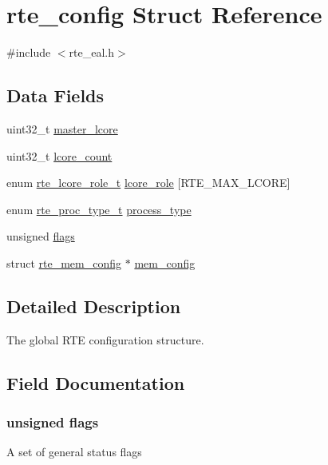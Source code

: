 \hypertarget{structrte__config}{}\section{rte\+\_\+config Struct Reference}
\label{structrte__config}


{\ttfamily \#include $<$rte\+\_\+eal.\+h$>$}

\subsection*{Data Fields}
\begin{DoxyCompactItemize}
\item 
uint32\+\_\+t \hyperlink{structrte__config_abe59d1b8baa4c39f023b18bd28bfd555}{master\+\_\+lcore}
\item 
uint32\+\_\+t \hyperlink{structrte__config_a17ac87c5aeee30c5651a0eb3cfa9e0df}{lcore\+\_\+count}
\item 
enum \hyperlink{rte__eal_8h_a4b3d3708f5bd9a9634d494b64cafc0b8}{rte\+\_\+lcore\+\_\+role\+\_\+t} \hyperlink{structrte__config_a79a713f1c76515dd44c9ba8b55d090b5}{lcore\+\_\+role} \mbox{[}R\+T\+E\+\_\+\+M\+A\+X\+\_\+\+L\+C\+O\+R\+E\mbox{]}
\item 
enum \hyperlink{rte__eal_8h_a1c1b5d8e30606d1b95f36413c2294d49}{rte\+\_\+proc\+\_\+type\+\_\+t} \hyperlink{structrte__config_a711b13dd2d53c31332977fb4247ecd98}{process\+\_\+type}
\item 
unsigned \hyperlink{structrte__config_a8b08a4d2ec878257d64c55f64a62242c}{flags}
\item 
struct \hyperlink{structrte__mem__config}{rte\+\_\+mem\+\_\+config} $\ast$ \hyperlink{structrte__config_acffed27cbdbce4d200a1b4d37b9a9ce6}{mem\+\_\+config}
\end{DoxyCompactItemize}


\subsection{Detailed Description}
The global R\+T\+E configuration structure. 

\subsection{Field Documentation}
\hypertarget{structrte__config_a8b08a4d2ec878257d64c55f64a62242c}{}
\subsubsection[{flags}]{\setlength{\rightskip}{0pt plus 5cm}unsigned flags}\label{structrte__config_a8b08a4d2ec878257d64c55f64a62242c}
A set of general status flags \hypertarget{structrte__config_a17ac87c5aeee30c5651a0eb3cfa9e0df}{}

